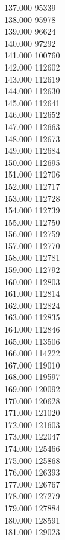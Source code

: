 { 137.000	95339 \\
 138.000	95978 \\
 139.000	96624 \\
 140.000	97292 \\
 141.000	100760 \\
 142.000	112602 \\
 143.000	112619 \\
 144.000	112630 \\
 145.000	112641 \\
 146.000	112652 \\
 147.000	112663 \\
 148.000	112673 \\
 149.000	112684 \\
 150.000	112695 \\
 151.000	112706 \\
 152.000	112717 \\
 153.000	112728 \\
 154.000	112739 \\
 155.000	112750 \\
 156.000	112759 \\
 157.000	112770 \\
 158.000	112781 \\
 159.000	112792 \\
 160.000	112803 \\
 161.000	112814 \\
 162.000	112824 \\
 163.000	112835 \\
 164.000	112846 \\
 165.000	113506 \\
 166.000	114222 \\
 167.000	119010 \\
 168.000	119597 \\
 169.000	120092 \\
 170.000	120628 \\
 171.000	121020 \\
 172.000	121603 \\
 173.000	122047 \\
 174.000	125466 \\
 175.000	125868 \\
 176.000	126393 \\
 177.000	126767 \\
 178.000	127279 \\
 179.000	127884 \\
 180.000	128591 \\
 181.000	129023 \\
}
